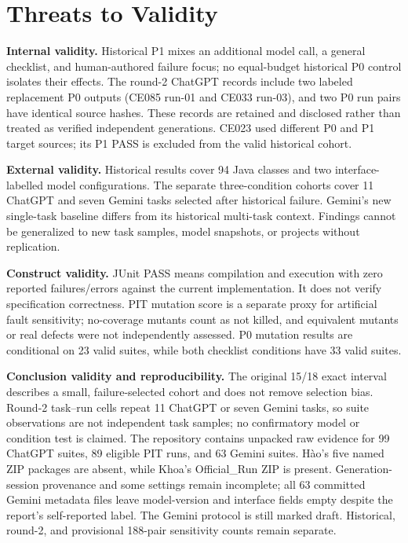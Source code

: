 \section{Threats to Validity}
\label{sec:threats}
\textbf{Internal validity.} Historical P1 mixes an additional model call, a general checklist, and human-authored failure focus; no equal-budget historical P0 control isolates their effects. The round-2 ChatGPT records include two labeled replacement P0 outputs (CE085 run-01 and CE033 run-03), and two P0 run pairs have identical source hashes. These records are retained and disclosed rather than treated as verified independent generations. CE023 used different P0 and P1 target sources; its P1 PASS is excluded from the valid historical cohort.

\textbf{External validity.} Historical results cover 94 Java classes and two interface-labelled model configurations. The separate three-condition cohorts cover 11 ChatGPT and seven Gemini tasks selected after historical failure. Gemini's new single-task baseline differs from its historical multi-task context. Findings cannot be generalized to new task samples, model snapshots, or projects without replication.

\textbf{Construct validity.} JUnit PASS means compilation and execution with zero reported failures/errors against the current implementation. It does not verify specification correctness. PIT mutation score is a separate proxy for artificial fault sensitivity; no-coverage mutants count as not killed, and equivalent mutants or real defects were not independently assessed. P0 mutation results are conditional on 23 valid suites, while both checklist conditions have 33 valid suites.

\textbf{Conclusion validity and reproducibility.} The original 15/18 exact interval describes a small, failure-selected cohort and does not remove selection bias. Round-2 task--run cells repeat 11 ChatGPT or seven Gemini tasks, so suite observations are not independent task samples; no confirmatory model or condition test is claimed. The repository contains unpacked raw evidence for 99 ChatGPT suites, 89 eligible PIT runs, and 63 Gemini suites. Hào's five named ZIP packages are absent, while Khoa's Official\_Run ZIP is present. Generation-session provenance and some settings remain incomplete; all 63 committed Gemini metadata files leave model-version and interface fields empty despite the report's self-reported label. The Gemini protocol is still marked draft. Historical, round-2, and provisional 188-pair sensitivity counts remain separate.
